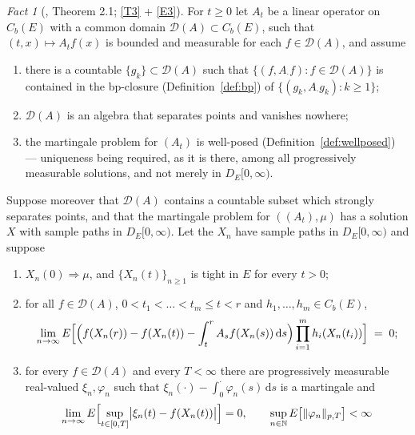 \documentclass[11pt,a4paper]{article}
\theoremstyle{plain}
\theoremstyle{definition}
\theoremstyle{remark}
\newtheorem{fact}[theorem]{Fact}
\newcommand{\N}{\mathbb{N}}
\newcommand{\Cb}{C_b}                          %
\newcommand{\DE}{D_E[0,\infty)}
\newcommand{\dom}{\mathcal{D}}                 %
\newcommand{\dif}{\,\mathrm{d}}
\DeclareMathOperator*{\wto}{\Rightarrow}
\newcommand{\BK}{\cite{BK93}}
\begin{document}
\begin{fact}[\BK, Theorem 2.1; \eqref{T3} + \eqref{E3}]
  \label{fact:BKtight}
  For $t \geq 0$ let $A_t$ be a linear operator on $\Cb(E)$ with a common domain
  $\dom(A) \subset \Cb(E)$, such that $(t,x) \mapsto A_tf(x)$ is bounded and
  measurable for each $f \in \dom(A)$, and assume
  \begin{enumerate}[label=(\Roman*)]
  \item \label{it:BK1} there is a countable $\{g_k\} \subset \dom(A)$ such that
    $\{(f, A_\cdot f) : f \in \dom(A)\}$ is contained in the bp-closure
    (Definition~\ref{def:bp}) of $\{(g_k, A_\cdot g_k) : k \geq 1\}$;
  \item \label{it:BK2} $\dom(A)$ is an algebra that separates points and vanishes
    nowhere;
  \item \label{it:BK3} the martingale problem for $(A_t)$ is well-posed
    (Definition~\ref{def:wellposed}) --- uniqueness being required, as it is
    there, among all progressively measurable solutions, and not merely
    in $\DE$.
  \end{enumerate}
  Suppose moreover that $\dom(A)$ contains a countable subset which strongly
  separates points, and that the martingale problem for $((A_t),\mu)$ has a
  solution $X$ with sample paths in $\DE$.  Let the $X_n$ have sample paths in
  $\DE$ and suppose
  \begin{enumerate}[label=(\alph*)]
  \item \label{it:BKa} $X_n(0) \wto \mu$, and $\{X_n(t)\}_{n \geq 1}$ is tight in
    $E$ for every $t > 0$;
  \item \label{it:BKb} for all $f \in \dom(A)$, $0 < t_1 < \dots < t_m \leq t < r$
    and $h_1,\dots,h_m \in \Cb(E)$,
    \begin{equation}
      \label{eq:BKIV}
      \lim_{n \to \infty} E\Bigl[ \Bigl( f(X_n(r)) - f(X_n(t))
        - \int_t^r A_sf(X_n(s)) \dif s \Bigr)
        \prod_{i=1}^m h_i(X_n(t_i)) \Bigr] \;=\; 0 ;
    \end{equation}
  \item \label{it:BKc} for every $f \in \dom(A)$ and every $T < \infty$ there are
    progressively measurable real-valued $\xi_n, \varphi_n$ such that
    $\xi_n(\cdot) - \int_0^{\cdot} \varphi_n(s) \dif s$ is a martingale and
    \begin{equation}
      \label{eq:BKapprox}
      \lim_{n \to \infty}
        E\Bigl[ \sup_{t \in [0,T]} \bigl| \xi_n(t) - f(X_n(t)) \bigr| \Bigr] = 0,
      \qquad
      \sup_{n \in \N} E\bigl[ \lVert \varphi_n \rVert_{p,T} \bigr] < \infty

\end{equation}
\end{enumerate}
\end{fact}
\end{document}

